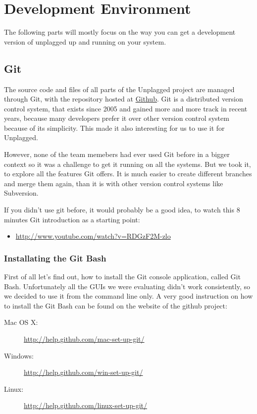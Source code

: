\section{Development Environment}

The following parts will mostly focus on the way you can get a development version of unplagged up and running on your 
system.

\subsection{Git}
The source code and files of all parts of the Unplagged project are managed through Git, 
with the repository hosted at \href{https://github.com}{Github}. 
Git is a distributed version control system, that exists since 2005 and gained more and more 
track in recent years, because many developers prefer it over other version control system because of its simplicity. This
made it also interesting for us to use it for Unplagged. %

However, none of the team memebers had ever used 
Git before in a bigger context so it was a challenge to get it running on all the systems. But we took it, to explore all the 
features Git offers. It is much easier to create different branches and merge them again, than it is with other 
version control systems like Subversion.

If you didn't use git before, it would probably be a good idea, to watch this 8 minutes Git introduction as a starting point:

\begin{itemize}
\item \url{http://www.youtube.com/watch?v=RDGzF2M-zlo}
\end{itemize}

\subsubsection{Installating the Git Bash}

First of all let's find out, how to install the Git console application, called Git Bash. 
Unfortunately all the GUIs we were evaluating didn't work consistently, so we decided to use it from the command line 
only. 
A very good instruction on how to install the Git Bash can be found on the website of the github project:

\begin{description}
\item[Mac OS X:] \url{http://help.github.com/mac-set-up-git/}
\item[Windows:] \url{http://help.github.com/win-set-up-git/}
\item[Linux:] \url{http://help.github.com/linux-set-up-git/}
\end{description}

